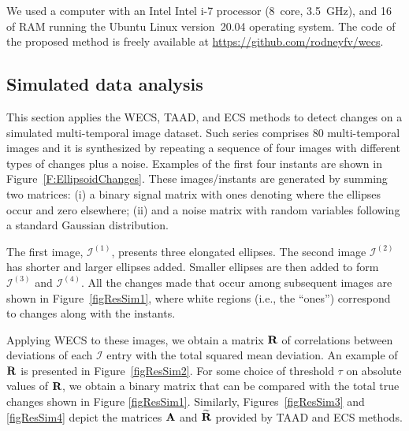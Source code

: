 \documentclass[journal]{IEEEtran}
\newcommand{\vA}{{\textbf A}}
\newcommand{\vR}{{\textbf R}}
\begin{document}
We used a computer with an Intel Intel i-7 processor (\SI{8}{core}, \SI{3.5}{\giga\hertz}), and \SI{16}{\giga\byte} of RAM running the Ubuntu Linux version~20.04 operating system.
The code of the proposed method is freely available at \url{https://github.com/rodneyfv/wecs}. 


\subsection{Simulated data analysis}\label{secExpSimulated}

This section applies the WECS, TAAD, and ECS methods to detect changes on a simulated multi-temporal image dataset. 
Such series comprises 80 multi-temporal images and it is synthesized by repeating a sequence of four images with different types of changes plus a noise. 
Examples of the first four instants are shown in Figure~\ref{F:EllipsoidChanges}. 
These images/instants are generated by summing two matrices: (i) a binary signal matrix with ones denoting where the ellipses occur and zero elsewhere; (ii) and a noise matrix with random variables following a standard Gaussian distribution. 

The first image, $\mathcal{I}^{(1)}$, presents three elongated ellipses. The second image $\mathcal{I}^{(2)}$ has shorter and larger ellipses added. Smaller ellipses are then added to form $\mathcal{I}^{(3)}$ and $\mathcal{I}^{(4)}$. All the changes made that occur among subsequent images are shown in Figure~\ref{figResSim1}, where white regions (i.e., the ``ones'') correspond to changes along with the instants.

Applying WECS to these images, we obtain a matrix $\vR$ of correlations between deviations of each $\mathcal{I}$ entry with the total squared mean deviation. An example of $\vR$ is presented in Figure~\ref{figResSim2}. For some choice of threshold $\tau$ on absolute values of $\vR$, we obtain a binary matrix that can be compared with the total true changes shown in Figure \ref{figResSim1}.
Similarly, Figures~\ref{figResSim3} and \ref{figResSim4} depict the matrices $\vA$ and $\widetilde{\vR}$ provided by TAAD and ECS methods.
\end{document}

